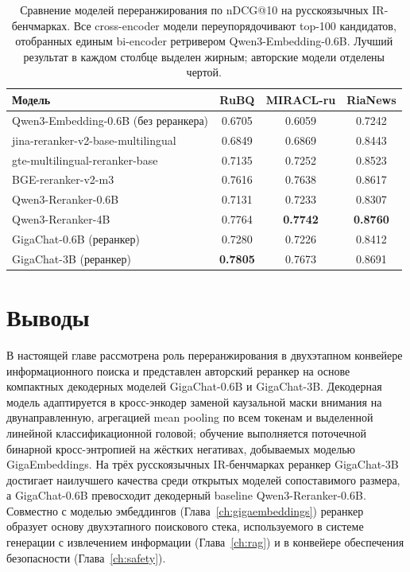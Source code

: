 \begin{table}[H]
    \centering
    \caption{Сравнение моделей переранжирования по nDCG@10 на русскоязычных IR-бенчмарках. Все cross-encoder модели переупорядочивают top-100 кандидатов, отобранных единым bi-encoder ретривером Qwen3-Embedding-0.6B. Лучший результат в каждом столбце выделен жирным; авторские модели отделены чертой.}
    \label{tab:rr_results}
    \begin{tabular}{lccc}
        \toprule
        Модель & RuBQ & MIRACL-ru & RiaNews \\
        \midrule
        Qwen3-Embedding-0.6B (без реранкера)  & 0.6705 & 0.6059 & 0.7242 \\
        jina-reranker-v2-base-multilingual    & 0.6849 & 0.6869 & 0.8443 \\
        gte-multilingual-reranker-base        & 0.7135 & 0.7252 & 0.8523 \\
        BGE-reranker-v2-m3                    & 0.7616 & 0.7638 & 0.8617 \\
        Qwen3-Reranker-0.6B                   & 0.7131 & 0.7233 & 0.8307 \\
        Qwen3-Reranker-4B                     & 0.7764 & \textbf{0.7742} & \textbf{0.8760} \\
        \midrule
        GigaChat-0.6B (реранкер)              & 0.7280 & 0.7226 & 0.8412 \\
        GigaChat-3B (реранкер)                & \textbf{0.7805} & 0.7673 & 0.8691 \\
        \bottomrule
    \end{tabular}
\end{table}

\section{Выводы}\label{sec:rr_conclusions}

В настоящей главе рассмотрена роль переранжирования в двухэтапном конвейере информационного поиска и представлен авторский реранкер на основе компактных декодерных моделей GigaChat-0.6B и GigaChat-3B.
Декодерная модель адаптируется в кросс-энкодер заменой каузальной маски внимания на двунаправленную, агрегацией mean pooling по всем токенам и выделенной линейной классификационной головой; обучение выполняется поточечной бинарной кросс-энтропией на жёстких негативах, добываемых моделью GigaEmbeddings.
На трёх русскоязычных IR-бенчмарках реранкер GigaChat-3B достигает наилучшего качества среди открытых моделей сопоставимого размера, а GigaChat-0.6B превосходит декодерный baseline Qwen3-Reranker-0.6B.
Совместно с моделью эмбеддингов (Глава~\ref{ch:gigaembeddings}) реранкер образует основу двухэтапного поискового стека, используемого в системе генерации с извлечением информации (Глава~\ref{ch:rag}) и в конвейере обеспечения безопасности (Глава~\ref{ch:safety}).
